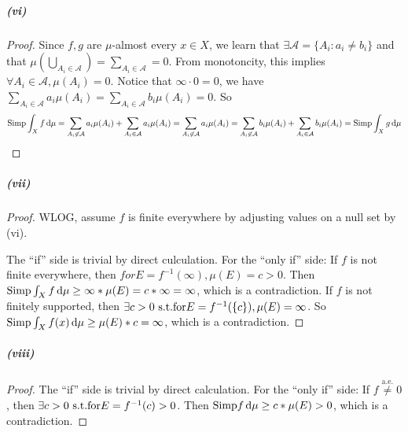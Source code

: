 \documentclass{article}
\begin{document}
\subparagraph{(vi)}
\begin{proof}
Since $f,g$ are $\mu$-almost every $x\in X$, we learn that $\exists \mathcal{A}=\{A_i:a_i\neq b_i\}$ and that $\mu(\bigcup\limits_{A_i\in \mathcal{A}})=\sum\limits_{A_i\in \mathcal{A}}=0$. From monotoncity, this implies $\forall A_i\in \mathcal{A}, \mu(A_i)=0$. Notice that $\infty\cdot 0=0$, we have $\sum\limits_{A_i\in \mathcal{A}}a_i\mu(A_i)=\sum\limits_{A_i\in\mathcal{A}}b_i\mu(A_i)=0$. So
\[\mathrm{Simp}\int_{X} f\,\mathrm{d} \mu=\sum_{A_i\not\in \mathcal{A}}a_i\mu(A_i)+\sum_{A_i\in \mathcal{A}}a_i\mu(A_i)=\sum_{A_i\not\in \mathcal{A}}a_i\mu(A_i)=\sum_{A_i\not\in \mathcal{A}}b_i\mu(A_i)+\sum_{A_i\in \mathcal{A}}b_i\mu(A_i)=\mathrm{Simp}\int_{X} g\,\mathrm{d} \mu\]
\end{proof}
\subparagraph{(vii)}
\begin{proof}
WLOG, assume $f$ is finite everywhere by adjusting values on a null set by (vi).

The ``if'' side is trivial by direct culculation. For the ``only if'' side: If $f$ is not finite everywhere, then $ for E=f^{-1}(\infty),\mu(E)=c>0$. Then $\mathrm{Simp}\int_{X} f\,\mathrm{d} \mu\geq \infty*\mu(E)=c*\infty=\infty$, which is a contradiction. If $f$ is not finitely supported, then $\exists c>0\text{ s.t.} \text{for} E=f^{-1}(\{c\}), \mu(E)=\infty$. So $\mathrm{Simp}\int_{X} f(x)\,\mathrm{d} \mu\geq \mu(E)*c=\infty$, which is a contradiction.
\end{proof}
\subparagraph{(viii)}
\begin{proof}
The ``if'' side is trivial by direct calculation. For the ``only if'' side: If $f\stackrel{\mathrm{a.e.}}{\neq}0$, then $\exists c>0\text{ s.t.} \text{for} E=f^{-1}(c)>0$. Then $\mathrm{Simp} f\,\mathrm{d} \mu\geq c*\mu(E)>0$, which is a contradiction.
\end{proof}

\newcommand{\cit}{\int_{X}}
\end{document}
